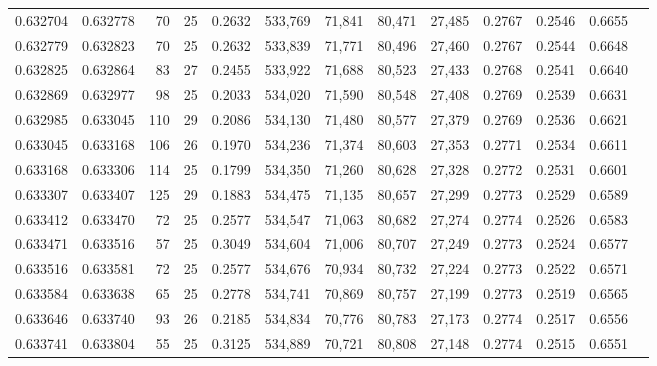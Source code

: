 \begin{tabular}{rrrrrrrrrrrrr}
0.632704 & 0.632778 &  70 &  25 &                                     0.2632 & 533,769 &  71,841 &  80,471 &  27,485 & 0.2767 & 0.2546 & 0.6655 \\
0.632779 & 0.632823 &  70 &  25 &                                     0.2632 & 533,839 &  71,771 &  80,496 &  27,460 & 0.2767 & 0.2544 & 0.6648 \\
0.632825 & 0.632864 &  83 &  27 &                                     0.2455 & 533,922 &  71,688 &  80,523 &  27,433 & 0.2768 & 0.2541 & 0.6640 \\
0.632869 & 0.632977 &  98 &  25 &                                     0.2033 & 534,020 &  71,590 &  80,548 &  27,408 & 0.2769 & 0.2539 & 0.6631 \\
0.632985 & 0.633045 & 110 &  29 &                                     0.2086 & 534,130 &  71,480 &  80,577 &  27,379 & 0.2769 & 0.2536 & 0.6621 \\
0.633045 & 0.633168 & 106 &  26 &                                     0.1970 & 534,236 &  71,374 &  80,603 &  27,353 & 0.2771 & 0.2534 & 0.6611 \\
0.633168 & 0.633306 & 114 &  25 &                                     0.1799 & 534,350 &  71,260 &  80,628 &  27,328 & 0.2772 & 0.2531 & 0.6601 \\
0.633307 & 0.633407 & 125 &  29 &                                     0.1883 & 534,475 &  71,135 &  80,657 &  27,299 & 0.2773 & 0.2529 & 0.6589 \\
0.633412 & 0.633470 &  72 &  25 &                                     0.2577 & 534,547 &  71,063 &  80,682 &  27,274 & 0.2774 & 0.2526 & 0.6583 \\
0.633471 & 0.633516 &  57 &  25 &                                     0.3049 & 534,604 &  71,006 &  80,707 &  27,249 & 0.2773 & 0.2524 & 0.6577 \\
0.633516 & 0.633581 &  72 &  25 &                                     0.2577 & 534,676 &  70,934 &  80,732 &  27,224 & 0.2773 & 0.2522 & 0.6571 \\
0.633584 & 0.633638 &  65 &  25 &                                     0.2778 & 534,741 &  70,869 &  80,757 &  27,199 & 0.2773 & 0.2519 & 0.6565 \\
0.633646 & 0.633740 &  93 &  26 &                                     0.2185 & 534,834 &  70,776 &  80,783 &  27,173 & 0.2774 & 0.2517 & 0.6556 \\
0.633741 & 0.633804 &  55 &  25 &                                     0.3125 & 534,889 &  70,721 &  80,808 &  27,148 & 0.2774 & 0.2515 & 0.6551 \\

\end{tabular}

